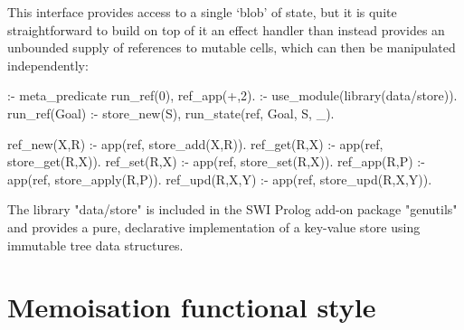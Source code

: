 This interface provides access to a single `blob' of state, but it is quite 
straightforward to build on top of it an effect handler than instead provides an 
unbounded supply of references to mutable cells, which can then be manipulated independently:
\begin{prolog-framed}[name=ccstate]
	:- meta_predicate run_ref(0), ref_app(+,2).
	:- use_module(library(data/store)).
	run_ref(Goal) :- store_new(S), run_state(ref, Goal, S, _).

	ref_new(X,R)   :- app(ref, store_add(X,R)).
	ref_get(R,X)   :- app(ref, store_get(R,X)).
	ref_set(R,X)   :- app(ref, store_set(R,X)).
	ref_app(R,P)   :- app(ref, store_apply(R,P)).
	ref_upd(R,X,Y) :- app(ref, store_upd(R,X,Y)).
\end{prolog-framed}
The library "data/store" is included in the SWI Prolog add-on package "genutils"
and provides a pure, declarative implementation of a key-value store using immutable tree data structures.

\section{Memoisation functional style}

